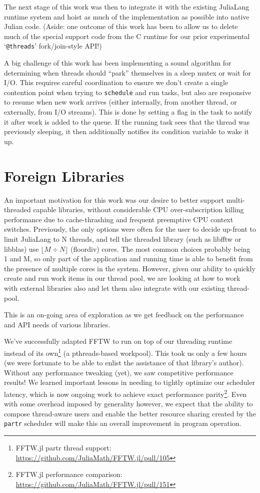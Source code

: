 \documentclass{juliacon}
\begin{document}
The next stage of this work was then to integrate it with the existing JuliaLang runtime system and hoist as much of the implementation as possible into native Julian code. (Aside: one outcome of this work has been to allow us to delete much of the special support code from the C runtime for our prior experimental `\verb|@threads|' fork/join-style API!)

A big challenge of this work has been implementing a sound algorithm for determining when threads should ``park'' themselves in a sleep mutex or wait for I/O. This requires careful coordination to ensure we don't create a single contention point when trying to \verb|schedule| and run tasks, but also are responsive to resume when new work arrives (either internally, from another thread, or externally, from I/O streams). This is done by setting a flag in the task to notify it after work is added to the queue. If the running task sees that the thread was previously sleeping, it then additionally notifies its condition variable to wake it up.

\section{Foreign Libraries}
\label{subsub:ffi}

An important motivation for this work was our desire to better support multi-threaded capable libraries, without considerable CPU over-subscription killing performance due to cache-thrashing and frequent preemptive CPU context switches. Previously, the only options were often for the user to decide up-front to limit JuliaLang to N threads, and tell the threaded library (such as libfftw or libblas) use $\lfloor M \div N \rfloor$ (floordiv) cores. The most common choices probably being 1 and M, so only part of the application and running time is able to benefit from the presence of multiple cores in the system. However, given our ability to quickly create and run work items in our thread pool, we are looking at how to work with external libraries also and let them also integrate with our existing thread-pool.

This is an on-going area of exploration as we get feedback on the performance and API needs of various libraries.

We've successfully adapted FFTW to run on top of our threading runtime instead of its own\footnote{FFTW.jl partr thread support: \url{https://github.com/JuliaMath/FFTW.jl/pull/105}} (a pthreads-based workpool). This took us only a few hours (we were fortunate to be able to enlist the assistance of that library's author). Without any performance tweaking (yet), we saw competitive performance results! We learned important lessons in needing to tightly optimize our scheduler latency, which is now ongoing work to achieve exact performance parity\footnote{FFTW.jl performance comparison: \url{https://github.com/JuliaMath/FFTW.jl/pull/151}}. Even with some overhead imposed by generality however, we expect that the ability to compose thread-aware users and enable the better resource sharing created by the \verb|partr| scheduler will make this an overall improvement in program operation.
\end{document}
